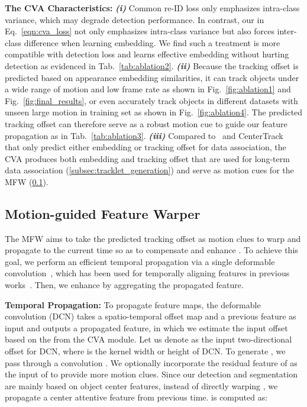 \documentclass[final]{cvpr}
\newcommand{\myparagraph}[1]{{\vspace{0.5em} \noindent \bf #1}}
\begin{document}
\myparagraph{The CVA Characteristics:} \textbf{\emph{(i)}} Common re-ID loss only emphasizes intra-class variance, which may degrade detection performance. In contrast, our  in Eq.~\ref{eqn:cva_loss} not only emphasizes intra-class variance but also forces inter-class difference when learning embedding. We find such a treatment is more compatible with detection loss and learns effective embedding without hurting detection as evidenced in Tab.~\ref{tab:ablation2}. \textbf{\emph{(ii)}} Because the tracking offset is predicted based on appearance embedding similarities, it can track objects under a wide range of motion and low frame rate as shown in Fig.~\ref{fig:ablation1} and Fig.~\ref{fig:final_results}, or even accurately track objects in different datasets with unseen large motion in training set as shown in Fig.~\ref{fig:ablation4}. The predicted tracking offset can therefore serve as a robust motion cue to guide our feature propagation as in Tab.~\ref{tab:ablation3}. \textbf{\emph{(iii)}} Compared to~\cite{wang2019towards,lu2020retinatrack} and CenterTrack~\cite{CenterTrack} that only predict either embedding or tracking offset for data association, the CVA produces both embedding and tracking offset that are used for long-term data association (\cref{subsec:tracklet_generation}) and serve as motion cues for the MFW (\cref{subsec:MFW}).

\subsection{Motion-guided Feature Warper}
\label{subsec:MFW}
The MFW aims to take the predicted tracking offset  as motion clues to warp and propagate  to the current time so as to compensate and enhance . To achieve this goal, we perform an efficient temporal propagation via a single deformable convolution~\cite{dai2017deformable}, which has been used for temporally aligning features in previous works~\cite{bertasius2018object,bertasius2019learning,deng2020single}. Then, we enhance  by aggregating the propagated feature.

\myparagraph{Temporal Propagation:} 
To propagate feature maps, the deformable convolution (DCN) takes a spatio-temporal offset map and a previous feature as input and outputs a propagated feature, in which we estimate the input offset based on the  from the CVA module. Let us denote  as the input two-directional offset for DCN, where  is the kernel width or height of DCN. To generate , we pass  through a  convolution . We optionally incorporate the residual feature of  as the input of  to provide more motion clues. Since our detection and segmentation are mainly based on object center features, instead of directly warping , we propagate a center attentive feature  from previous time.  is computed as:
\vspace{-1mm}
\end{document}

